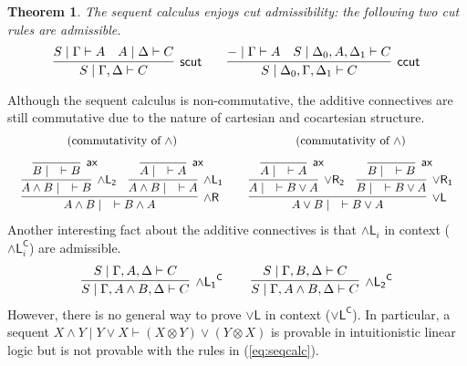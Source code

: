 \documentclass[submission,copyright,creativecommons]{eptcs}
\newtheorem{theorem}{Theorem}[section]
\theoremstyle{definition}
\newcommand{\andlone}{\land \mathsf{L_{1}}}
\newcommand{\andltwo}{\land \mathsf{L_{2}}}
\newcommand{\andli}{\land \mathsf{L}_{i}}
\newcommand{\andr}{\land \mathsf{R}}
\newcommand{\orl}{\lor \mathsf{L}}
\newcommand{\orrone}{\lor \mathsf{R_{1}}}
\newcommand{\orrtwo}{\lor \mathsf{R_{2}}}
\newcommand{\ax}{\mathsf{ax}}
\newcommand{\ot}{\otimes}
\newcommand{\proofbox}[1]{\begin{tabular}{l} #1 \end{tabular}}
\begin{document}
\begin{theorem}
  The sequent calculus enjoys cut admissibility: the following two cut rules are admissible.
    \begin{displaymath}
      \infer[\mathsf{scut}]{S \mid \Gamma , \Delta \vdash C}{
        S \mid \Gamma \vdash A
        &
        A \mid \Delta \vdash C
      }
      \qquad
      \infer[\mathsf{ccut}]{S \mid \Delta_0 , \Gamma , \Delta_1 \vdash C}{
        {-} \mid \Gamma \vdash A
        &
        S \mid \Delta_0 , A , \Delta_1 \vdash C
      }
    \end{displaymath}
  \end{theorem}
  Although the sequent calculus is non-commutative, the additive connectives are still commutative due to the nature of cartesian and cocartesian structure.
  \begin{displaymath}
    \begin{array}{cc}
      (\text{commutativity of } \land) & (\text{commutativity of } \land)
      \\[10pt]
      \proofbox{
        \infer[\andr]{A \land B \mid \quad \vdash B \land A}{
          \infer[\andltwo]{A \land B \mid \quad \vdash B}{
            \infer[\ax]{B \mid \quad \vdash B}{}
          }
          &
          \infer[\andlone]{A \land B \mid \quad \vdash A}{
            \infer[\ax]{A \mid \quad \vdash A}{}
          }
        }
      }
      &
      \proofbox{
        \infer[\orl]{A \lor B \mid \quad \vdash B \lor A}{
          \infer[\orrtwo]{A \mid \quad \vdash B \lor A}{
            \infer[\ax]{A \mid \quad \vdash A}{}
          }
          &
          \infer[\orrone]{B \mid \quad \vdash B \lor A}{
            \infer[\ax]{B \mid \quad \vdash B}{}
          }
        }
      }
    \end{array}
  \end{displaymath}
  Another interesting fact about the additive connectives is that $\andli$ in context ($\andli^{\mathsf{C}}$) are admissible.
  \begin{displaymath}
    \begin{array}{c}
      \proofbox{
        \infer[\andlone^{\mathsf{C}}]{S \mid \Gamma , A \land B , \Delta \vdash C}{
          S \mid \Gamma , A ,\Delta \vdash C
        }
      }
      \quad
      \proofbox{
        \infer[\andltwo^{\mathsf{C}}]{S \mid \Gamma , A \land B , \Delta \vdash C}{
          S \mid \Gamma , B ,\Delta \vdash C
        }
      }
    \end{array}
  \end{displaymath}
However, there is no general way to prove $\orl$ in context ($\orl^{\mathsf{C}}$).
In particular, a sequent $X \land Y \mid Y \lor X \vdash (X \ot Y) \lor (Y \ot X)$ is provable in intuitionistic linear logic but is not provable with the rules in (\ref{eq:seqcalc}).
\end{document}

